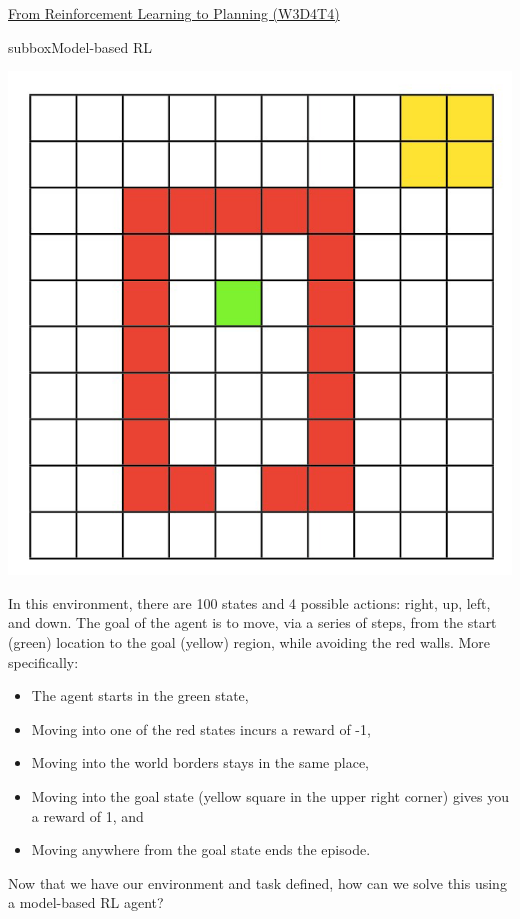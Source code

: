 \begin{textbox}{\href{https://compneuro.neuromatch.io/tutorials/W3D4_ReinforcementLearning/student/W3D4_Tutorial4.html}{From Reinforcement Learning to Planning (W3D4T4)} }
\begin{subbox}{subbox}{Model-based RL}
\begin{center}
\includegraphics[scale=0.14]{Figures/RL/RL_Figure16.png}
\end{center}
In this environment, there are 100 states and 4 possible actions: right, up, left, and down. The goal of the agent is to move, via a series of steps, from the start (green) location to the goal (yellow) region, while avoiding the red walls. More specifically:
\begin{itemize}
    \item 
 The agent starts in the green state,
\item Moving into one of the red states incurs a reward of -1,
\item Moving into the world borders stays in the same place,
\item Moving into the goal state (yellow square in the upper right corner) gives you a reward of 1, and
\item Moving anywhere from the goal state ends the episode.
\end{itemize}

Now that we have our environment and task defined, how can we solve this using a model-based RL agent?

\end{subbox}

\end{textbox}
